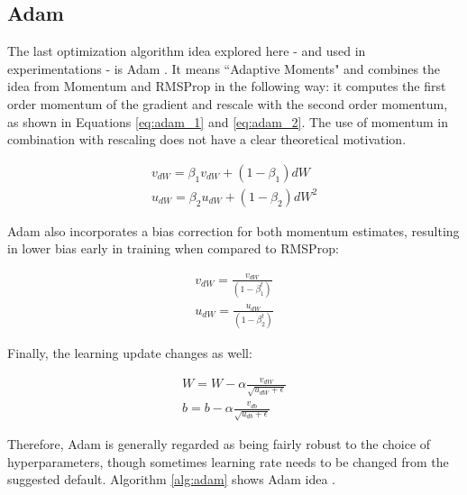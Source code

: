 \subsection{Adam}

The last optimization algorithm idea explored here - and used in experimentations - is Adam \cite{adam2014}. It means ``Adaptive Moments" and combines the idea from Momentum and RMSProp in the following way: it computes the first order momentum of the gradient and rescale with the second order momentum, as shown in Equations \ref{eq:adam_1} and \ref{eq:adam_2}. The use of momentum in combination with rescaling does not have a clear theoretical motivation. 

\begin{align}\label{eq:adam_1}
v_{dW} = \beta_{1} v_{dW} + (1 - \beta_{1})dW\\
u_{dW} = \beta_{2} u_{dW} + (1 - \beta_{2})dW^2
\label{eq:adam_2}
\end{align}

Adam also incorporates a bias correction for both momentum estimates, resulting in lower bias early in training when compared to RMSProp:

\begin{align}
v_{dW} = \frac{v_{dW}}{(1 - \beta_{1}^{t})}\\
u_{dW} = \frac{u_{dW}}{(1 - \beta_{2}^{t})}
\end{align}

Finally, the learning update changes as well:

\begin{align}
W = W - \alpha  \frac{v_{dW}}{\sqrt{u_{dW} + \epsilon}} \\
b = b - \alpha \frac{v_{db}}{\sqrt{u_{db} + \epsilon}}
\end{align}

Therefore, Adam is generally regarded as being fairly robust to the choice of hyperparameters, though sometimes learning rate needs to be changed from the suggested default.  Algorithm \ref{alg:adam} shows Adam idea \cite{Goodfellow-et-al-2016}.


